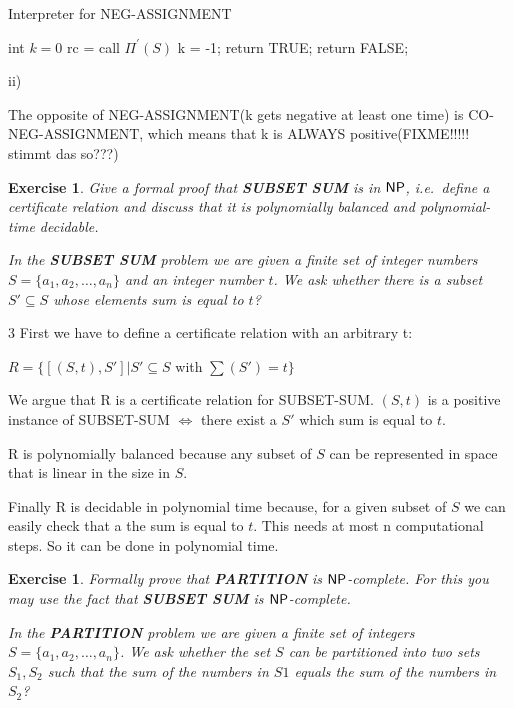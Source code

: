 \documentclass [11pt]{article}
\newtheorem{exercise}[theorem]{Exercise}
\newcommand{\ccfont}[1]{\protect\mathsf{#1}}
\newcommand{\NP}{\ccfont{NP}}
\newcommand{\solution}[1]{\noindent {\bf Solution.}  #1}
\begin{document}
\begin{algorithm}
\caption{Interpreter for NEG-ASSIGNMENT }
\label{intNEG}
\begin{algorithmic}

 \State int $k = 0$
 \State rc = call $\Pi^\prime(S)$
 \State k = -1;
  \State return TRUE;
 \Else
 \State return FALSE;
 \EndIf
\EndFunction

\end{algorithmic}
\end{algorithm}

\solution ii)

The opposite of NEG-ASSIGNMENT(k gets negative at least one time) is CO-NEG-ASSIGNMENT, which means that k is ALWAYS positive(FIXME!!!!! stimmt das so???)

\begin{exercise}
  Give a formal proof that \textbf{SUBSET SUM} is in $\NP$, i.e.\, define a
  certificate relation and discuss that it is polynomially balanced and
  polynomial-time decidable.
  
   \smallskip
    
  \noindent In the \textbf{SUBSET SUM} problem we are given a finite set of integer numbers $S=\{a_1, a_2, \ldots, a_n\}$ and an integer number $t$. We ask whether there is a subset $S'\subseteq S$ whose elements sum is equal to $t$?
  
\end{exercise}


\solution{ 3}
   \smallskip
First we have to define a certificate relation with an arbitrary t:

\bigskip

$R = \{ [(S,t),S']|  S' \subseteq S $ with $ \sum(S') = t \} $ 

\bigskip
We argue that R is a certificate relation for SUBSET-SUM. $(S,t)$ is a positive instance of SUBSET-SUM $ \Leftrightarrow $ there exist a $S'$ which sum is equal to $t$.   

\bigskip

R is polynomially balanced because any subset of $S$ can be represented in space that is linear in the size in $S$.

\bigskip

Finally R is decidable in polynomial time because, for a given subset of $S$ we can easily check that a the sum is equal to $t$. This needs at most n computational steps. So it can be done in polynomial time.


\begin{exercise}
  \label{ex:partition}
  Formally prove that \textbf{PARTITION} is $\NP$-complete. For this you may use
  the fact that \textbf{SUBSET SUM} is $\NP$-complete.   
  
  \smallskip
  \noindent In the \textbf{PARTITION} problem we are given a finite set of integers $S=\{a_1, a_2, \ldots, a_n\}$. We ask whether the set $S$ can be partitioned into two sets $S_1, S_2$ such that the sum of the numbers in $S1$ equals the sum of the numbers in $S_2$? 
  

\end{exercise}
\end{document}
